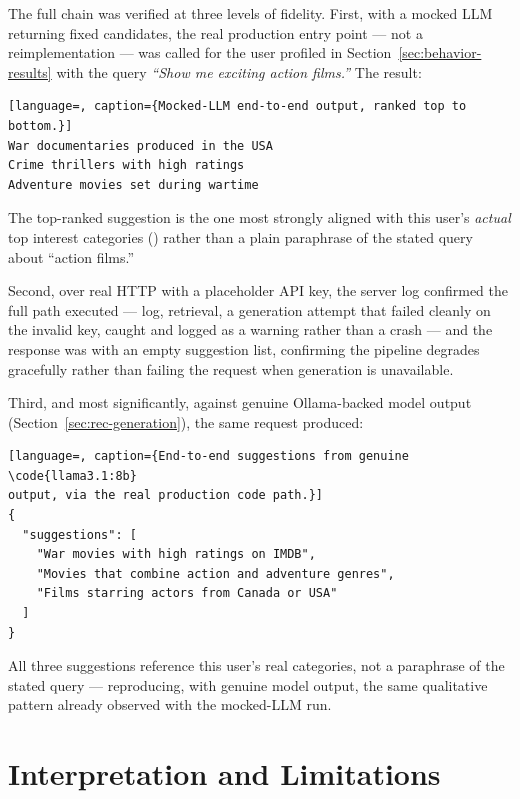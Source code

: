 The full chain was verified at three levels of fidelity. First, with a mocked LLM returning fixed
candidates, the real production entry point --- not a reimplementation --- was called for the
user profiled in Section~\ref{sec:behavior-results} with the query \emph{``Show me exciting action
films.''} The result:

\begin{lstlisting}[language=, caption={Mocked-LLM end-to-end output, ranked top to bottom.}]
War documentaries produced in the USA
Crime thrillers with high ratings
Adventure movies set during wartime
\end{lstlisting}

The top-ranked suggestion is the one most strongly aligned with this user's \emph{actual} top
interest categories () rather than a plain paraphrase of
the stated query about ``action films.''

Second, over real HTTP with a placeholder API key, the server log confirmed the full path executed
--- log, retrieval, a generation attempt that failed cleanly on the invalid key, caught and logged
as a warning rather than a crash --- and the response was  with an empty suggestion
list, confirming the pipeline degrades gracefully rather than failing the request when generation is
unavailable.

Third, and most significantly, against genuine Ollama-backed model output (Section~\ref{sec:rec-generation}),
the same request produced:

\begin{lstlisting}[language=, caption={End-to-end suggestions from genuine \code{llama3.1:8b}
output, via the real production code path.}]
{
  "suggestions": [
    "War movies with high ratings on IMDB",
    "Movies that combine action and adventure genres",
    "Films starring actors from Canada or USA"
  ]
}
\end{lstlisting}

All three suggestions reference this user's real  categories, not a paraphrase of
the stated query --- reproducing, with genuine model output, the same qualitative pattern already
observed with the mocked-LLM run.

\section{Interpretation and Limitations}
\label{sec:rec-limits}

